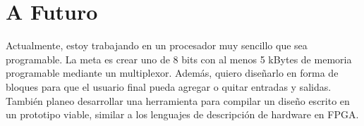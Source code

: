 \documentclass[]{article}
\begin{document}
\section{A Futuro}
Actualmente, estoy trabajando en un procesador muy sencillo que sea programable. La meta es crear uno de 8 bits con al menos 5 
kBytes de memoria programable mediante un multiplexor. Además, quiero diseñarlo en forma de bloques para que el usuario final
pueda agregar o quitar entradas y salidas. También planeo desarrollar una herramienta para compilar un diseño escrito en un
prototipo viable, similar a los lenguajes de descripción de hardware en FPGA.
\end{document}
